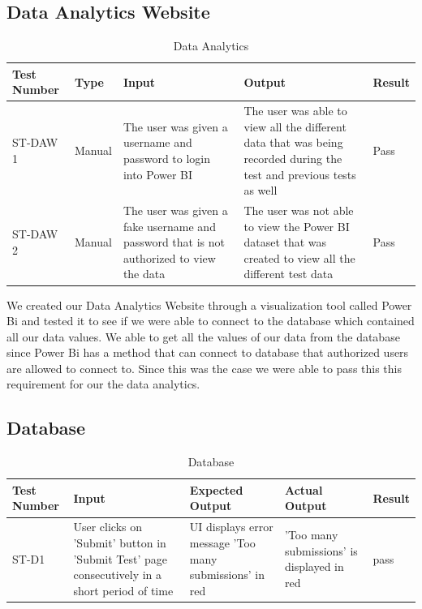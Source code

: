 \documentclass[12pt, titlepage]{article}
\begin{document}
\subsection{Data Analytics Website}
\begin{table}[H]
  \begin{tabular}{| p{} | p{}| p{}| p{}| p{}|}
    \hline
    \rowcolor[gray]{0.9}
    Test Number & Type & Input & Output & Result\\
    \hline
    ST-DAW 1 & Manual & The user was given a username and password to login into Power BI & The user was able to view all the different data that was being recorded during the test and previous tests as well & Pass\\
    \hline
    ST-DAW 2 & Manual & The user was given a fake username and password that is not authorized to view the data & The user was not able to view the Power BI dataset that was created to view all the different test data & Pass\\
    \hline
  \end{tabular}
  \caption{Data Analytics}
  \end{table} 

We created our Data Analytics Website through a visualization tool called Power Bi and tested it to see if we were able to connect to the database which contained all our data values. We able to get all the values of our data from the database since Power Bi has a method that can connect to database that authorized users are allowed to connect to. Since this was the case we were able to pass this this requirement for our the data analytics.


\subsection{Database}
\begin{table}[H]
\begin{tabular}{| p{} | p{}| p{}| p{}| p{}|}
  \hline
  \rowcolor[gray]{0.9}
  Test Number & Input & Expected Output & Actual Output & Result\\
  \hline
  ST-D1 & User clicks on 'Submit' button in 'Submit Test' page consecutively in a short period of time & UI displays error message 'Too many submissions' in red & 'Too many submissions' is displayed in red & pass \\
  \hline
\end{tabular}
\caption{Database}
\end{table}
\end{document}
